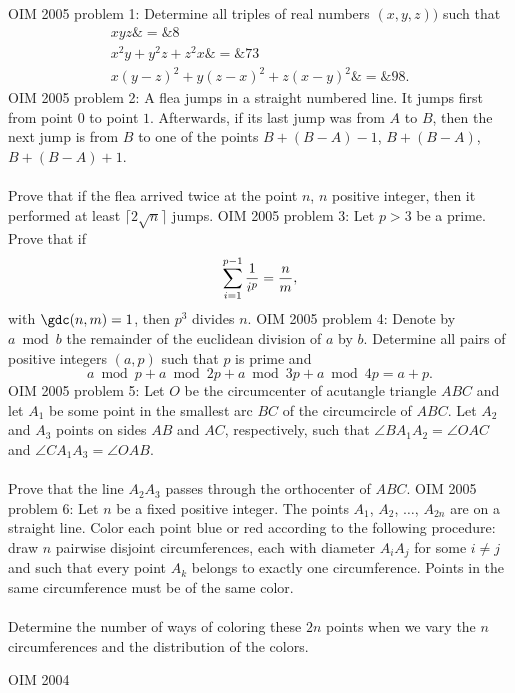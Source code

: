 OIM 2005 problem 1:  Determine all triples of real numbers $(x,y,z))$ such that
\begin{eqnarray*} xyz \&=\& 8 \\ x^2y + y^2z + z^2x \&=\& 73 \\ x(y-z)^2 + y(z-x)^2 + z(x-y)^2 \&=\& 98 . \end{eqnarray*} 
OIM 2005 problem 2:  A flea jumps in a straight numbered line. It jumps first from point $0$ to point $1$. Afterwards, if its last jump was from $A$ to $B$, then the next jump is from $B$ to one of the points $B + (B - A) - 1$, $B + (B - A)$, $B + (B-A) + 1$. \\\\
Prove that if the flea arrived twice at the point $n$, $n$ positive integer, then it performed at least $\lceil 2\sqrt n\rceil$ jumps. 
OIM 2005 problem 3:  Let $p > 3$ be a prime. Prove that if
\[ \sum_{i=1 }^{p-1}{1\over i^p} = {n\over m}, \]
with $\gdc(n,m) = 1$, then $p^3$ divides $n$. 
OIM 2005 problem 4:  Denote by $a \bmod b$ the remainder of the euclidean division of $a$ by $b$. Determine all pairs of positive integers $(a,p)$ such that $p$ is prime and
\[ a \bmod p + a\bmod 2p + a\bmod 3p + a\bmod 4p = a + p. \] 
OIM 2005 problem 5:  Let $O$ be the circumcenter of acutangle triangle $ABC$ and let $A_1$ be some point in the smallest arc $BC$ of the circumcircle of $ABC$. Let $A_2$ and $A_3$ points on sides $AB$ and $AC$, respectively, such that $\angle BA_1A_2 = \angle OAC$ and $\angle CA_1A_3 = \angle OAB$. \\\\
Prove that the line $A_2A_3$ passes through the orthocenter of $ABC$. 
OIM 2005 problem 6:  Let $n$ be a fixed positive integer. The points $A_1$, $A_2$, $\ldots$, $A_{2n}$ are on a straight line. Color each point blue or red according to the following procedure: draw $n$ pairwise disjoint circumferences, each with diameter $A_iA_j$ for some $i \neq j$ and such that every point $A_k$ belongs to exactly one circumference. Points in the same circumference must be of the same color. \\\\
Determine the number of ways of coloring these $2n$ points when we vary the $n$ circumferences and the distribution of the colors. 


OIM 2004 

